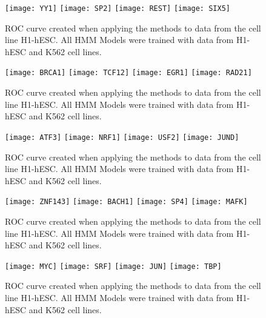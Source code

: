 \documentclass[11pt,a4]{article}
\begin{document}
\begin{figure}[h]
\centering
    \texttt{[image: YY1]}
    \texttt{[image: SP2]}
    \texttt{[image: REST]}
    \texttt{[image: SIX5]}
\caption{ROC curve created when applying the methods to data from the cell line H1-hESC. All HMM Models were trained with data from H1-hESC and K562 cell lines.}
\label{fig:roc.H1hesc.fdr_4.1}
\end{figure}

\begin{figure}[h]
\centering
    \texttt{[image: BRCA1]}
    \texttt{[image: TCF12]}
    \texttt{[image: EGR1]}
    \texttt{[image: RAD21]}
\caption{ROC curve created when applying the methods to data from the cell line H1-hESC. All HMM Models were trained with data from H1-hESC and K562 cell lines.}
\label{fig:roc.H1hesc.fdr_4.2}
\end{figure}

\begin{figure}[h]
\centering
    \texttt{[image: ATF3]}
    \texttt{[image: NRF1]}
    \texttt{[image: USF2]}
    \texttt{[image: JUND]}
\caption{ROC curve created when applying the methods to data from the cell line H1-hESC. All HMM Models were trained with data from H1-hESC and K562 cell lines.}
\label{fig:roc.H1hesc.fdr_4.3}
\end{figure}

\begin{figure}[h]
\centering
    \texttt{[image: ZNF143]}
    \texttt{[image: BACH1]}
    \texttt{[image: SP4]}
    \texttt{[image: MAFK]}
\caption{ROC curve created when applying the methods to data from the cell line H1-hESC. All HMM Models were trained with data from H1-hESC and K562 cell lines.}
\label{fig:roc.H1hesc.fdr_4.4}
\end{figure}

\begin{figure}[h]
\centering
    \texttt{[image: MYC]}
    \texttt{[image: SRF]}
    \texttt{[image: JUN]}
    \texttt{[image: TBP]}
\caption{ROC curve created when applying the methods to data from the cell line H1-hESC. All HMM Models were trained with data from H1-hESC and K562 cell lines.}
\label{fig:roc.H1hesc.fdr_4.5}
\end{figure}
\end{document}
